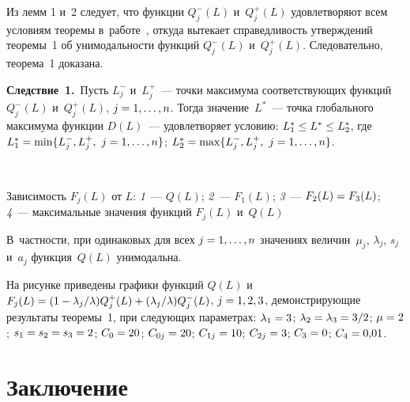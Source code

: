 \begin{multicols}{2}
   Из лемм 1 и~2 следует, что функции $Q_j^-(L)$ и~$Q_j^+(L)$  
удовле\-тво\-ря\-ют всем условиям тео\-ре\-мы в~работе~\cite{19-ag}, откуда 
вытекает спра\-вед\-ли\-вость утверж\-де\-ний тео\-ре\-мы~1 об  
уни\-мо\-даль\-ности функций $Q_j^-(L)$ и~$Q_j^+(L)$. Следовательно,  
тео\-ре\-ма~1 до\-ка\-зана.
  
  \smallskip
  
  \noindent
  \textbf{Следствие~1.}\  Пусть $L_j^-$ и~$L_j^+$~--- точ\-ки максимума 
со\-от\-вет\-ст\-ву\-ющих функций $Q_j^-(L)$ и~$Q_j^+(L)$, $j\hm=1,\ldots , n$. Тогда 
значение~$L^*$~--- точ\-ка глобального максимума функции $D(L)$~--- 
удовлетворяет условию: $L_1^*\hm\leq L^*\hm\leq L_2^*$, где $L_1^*\hm= \min 
\{ L_j^-, L_j^+,\ j\hm= 1,\ldots, n\}$; $L_2^*\hm= \max\{ L_j^-, L_j^+,\ j\hm= 
1,\ldots , n\}$.\linebreak\vspace*{-12pt}

{ \begin{center}  %
 \vspace*{-3pt}
   \mbox{%
\epsfxsize=78.231mm 
}

\end{center}

\vspace*{-2pt}

\noindent
\small{Зависимость $F_j(L)$ от $L$: \textit{1}~--- $Q(L)$; \textit{2}~--- 
$F_1(L)$; \textit{3}~--- $F_2(L)\hm= F_3(L)$; \textit{4}~--- максимальные 
значения функций $F_j(L)$ и~$Q(L)$
}
}

\vspace*{9pt}

\noindent
 В~част\-ности, при одинаковых для всех $j\hm= 1, \ldots, n$ 
значениях величин~$\mu_j$, $\lambda_j$, $s_j$ и~$a_j$ функ\-ция~$Q(L)$ 
уни\-мо\-дальна. 
  
  
  На рисунке приведены графики функций $Q(L)$ и~$F_j(L)\hm= (1\hm- 
\lambda_j/\lambda)Q_j^+(L)\hm+ (\lambda_j/\lambda)Q_j^-(L)$, $j\hm= 1,2,3$, 
де\-мон\-ст\-ри\-ру\-ющие результаты тео\-ре\-мы~1, при сле\-ду\-ющих па\-ра\-мет\-рах: 
$\lambda_1\hm= 3$; $\lambda_2\hm=\lambda_3=3/2$; $\mu\hm= 2$; 
$s_1\hm=s_2\hm=s_3\hm=2$; $C_0\hm=20$; $C_{0j}\hm=20$; $C_{1j}\hm=10$; 
$C_{2j}\hm= 3$; $C_3\hm= 0$; $C_4\hm= 0{,}01$.

  \vspace*{-6pt}
   
  \section{Заключение}
  

\end{multicols}
